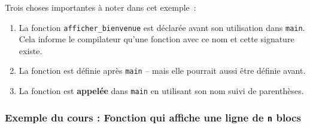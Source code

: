 Trois choses importantes à noter dans cet exemple :
\begin{enumerate}
	\item La fonction \texttt{afficher_bienvenue} est déclarée avant son utilisation dans \texttt{main}. Cela informe le compilateur qu'une fonction avec ce nom et cette signature existe.
	\item La fonction est définie après \texttt{main} -- mais elle pourrait aussi être définie avant.
	\item La fonction est \textbf{appelée} dans \texttt{main} en utilisant son nom suivi de parenthèses.
\end{enumerate}

\subsubsection{Exemple du cours : Fonction qui affiche une ligne de \texttt{n} blocs}

